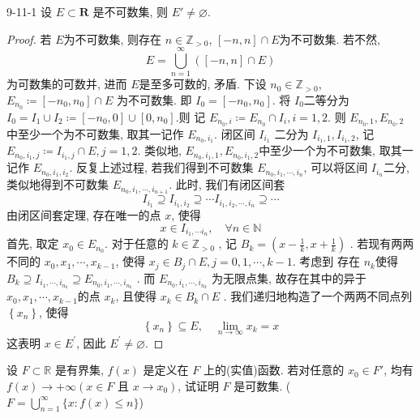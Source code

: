 \documentclass[../main.tex]{subfiles}
\begin{document}
\begin{exercise}{}{9-11-1}
    设 $E \subset \mathbf{R}$ 是不可数集, 则 $E' \neq \varnothing$.
\end{exercise}
\begin{proof}
    若 \(  E  \)为不可数集, 则存在 \(   n\in \mathbb{Z} _{> 0}  \), \(  \left[ -n,n  \right]\cap E   \)为不可数集. 若不然, \[
    E = \bigcup  _{n = 1}^{\infty} \left( \left[ -n,n \right]\cap E  \right) 
    \]   为可数集的可数并, 进而 \(  E  \)是至多可数的,  矛盾. 下设 \(  n_0 \in \mathbb{Z} _{> 0}  \), \(  E_{n_0}\coloneqq \left[ -n_0,n_0 \right]\cap E   \)   为不可数集. 即 \(  I_0= [-n_0, n_0]  \). 将 \(  I_0  \)二等分为 \(  I_0= I_1\cup I_2\coloneqq [-n_0,0]\cup [0,n_0]  \).则 记 \(  E_{n_0,i}\coloneqq E_{n_0}\cap I_{i}, i= 1,2  \). 则 \(  E_{n_0,1}, E_{n_0,2}  \)中至少一个为不可数集, 取其一记作 \(  E_{n_0,i_1}  \).      闭区间 \(  I_{i_1}  \) 二分为 \(  I_{i_1,1}, I_{i_1,2}  \), 记 \(  E_{n_0,i_1,j}\coloneqq I_{i_1,j}\cap E, j= 1,2  \). 类似地,  \(  E_{n_0,i_1,1}, E_{n_0,i_1,2}  \)中至少一个为不可数集, 取其一记作 \(  E_{n_0,i_1,i_2}  \). 反复上述过程, 若我们得到不可数集 \(  E_{n_0,i_1,\cdots ,i_{n}}  \), 可以将区间 \(  I_{i_{n}}  \)二分, 类似地得到不可数集 \(  E_{n_0,i_1,\cdots ,i_{n+ 1}}  \).       此时, 我们有闭区间套 \[
    I_{i_1}\supseteq I_{i_1,i_2}\supseteq \cdots I_{i_1,i_2,\cdots ,i_{n}}\supseteq  \cdots 
    \]由闭区间套定理, 存在唯一的点 \(  x    \), 使得 \[
     x \in I_{i_1,\cdots i_{n}},\quad \forall  n\in \mathbb{N} 
    \] 首先, 取定 \(  x_0 \in E_{n_0}  \). 对于任意的 \(  k \in \mathbb{Z} _{> 0}  \) , 记 \(  B_{k}= \left( x-\frac{1 }{k },x+ \frac{1 }{k }   \right)   \)  . 若现有两两不同的 \(  x_0,x_1,\cdots ,x_{k-1}  \), 使得 \(  x_{j}\in B_{j}\cap E, j= 0,1,\cdots ,k-1  \).   考虑到 存在 \(  n_{k}  \)使得 \(  B_{k}\supseteq I_{i_1,\cdots ,i_{n_{k}}}  \supseteq E_{n_0,i_1,\cdots ,i_{n_{k}}}\)  . 而 \(  E_{n_0,i_1,\cdots ,i_{n_{k}}}  \) 为无限点集,  故存在其中的异于 \(  x_0,x_1,\cdots ,x_{k-1}  \)的点 \(  x_{k}  \), 且使得 \(  x_{k}\in B_{k}\cap E  \)   . 我们递归地构造了一个两两不同点列 \(  \left\{ x_{n} \right\}  \), 使得 \[
    \left\{ x_{n} \right\}\subseteq E,\quad \lim _{n\to \infty}x_{k}= x
    \]这表明 \(  x \in E^{\prime}   \), 因此 \(  E^{\prime} \neq \varnothing  \).   
\end{proof}

\begin{exercise}{}{}
设 $F \subset \mathbb{R}$ 是有界集, $f(x)$ 是定义在 $F$ 上的(实值)函数. 若对任意的 $x_0 \in F'$, 均有 $f(x) \to +\infty (x \in F \text{ 且 } x \to x_0)$, 试证明 $F$ 是可数集. ($F = \bigcup_{n=1}^{\infty} \{x: f(x) \le n\}$)
\end{exercise}
\end{document}
